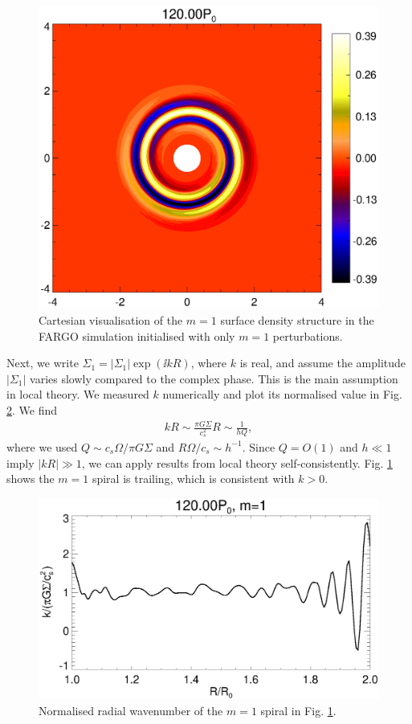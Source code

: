 \begin{figure}
  \includegraphics[width=\linewidth]{figures/polarxy2_dens120_fargo.ps}
  \caption{Cartesian visualisation of the $m=1$ surface density
    structure in the FARGO simulation initialised with only $m=1$
    perturbations. 
    \label{2d_fargo_viz}} 
\end{figure}   

Next, we write $\Sigma_1 = 
|\Sigma_1|\exp{(\ii kR)}$, where $k$ is real, and assume the amplitude
$|\Sigma_1|$ varies slowly compared to the complex phase. This is the
main assumption in local theory. We measured $k$ numerically and plot
its normalised value in Fig. \ref{fargo_wavenumber}. We find 
\begin{align*}
  kR \sim \frac{\pi G \Sigma}{c_s^2}R \sim \frac{1}{hQ}, 
\end{align*}
where we used $Q\sim c_s\Omega/\pi G \Sigma$ and $R\Omega/c_s\sim
h^{-1}$. Since $Q=O(1)$ and $h\ll 1$ imply $|kR|\gg 1$, we 
can apply results from local theory
self-consistently. Fig. \ref{2d_fargo_viz} shows the $m=1$ spiral is
trailing, which is consistent with $k>0$. 

\begin{figure}
  \includegraphics[width=\linewidth]{figures/m1_analysis_kr120_fargo.ps}
  \caption{Normalised radial wavenumber of the $m=1$ spiral in 
    Fig. \ref{2d_fargo_viz}.\label{fargo_wavenumber}} 
\end{figure}   

